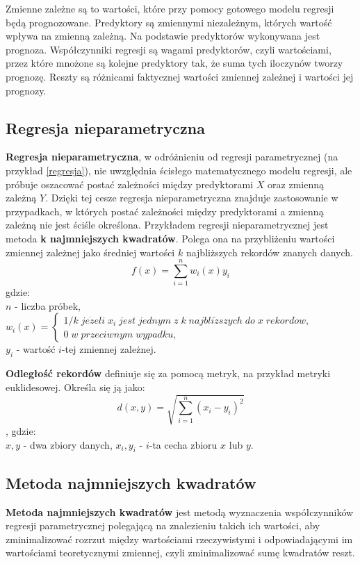 Zmienne zależne są to wartości, które przy pomocy gotowego modelu regresji będą prognozowane. Predyktory są zmiennymi niezależnym, których wartość wpływa na zmienną zależną. Na podstawie predyktorów wykonywana jest prognoza. Współczynniki regresji są wagami predyktorów, czyli wartościami, przez które mnożone są kolejne predyktory tak, że suma tych iloczynów tworzy prognozę. Reszty są różnicami faktycznej wartości zmiennej zależnej i wartości jej prognozy.
\subsection{Regresja nieparametryczna}
\textbf{Regresja nieparametryczna}, w odróżnieniu od regresji parametrycznej (na przykład \ref{regresja}), nie uwzględnia ścisłego matematycznego modelu regresji, ale próbuje oszacować postać zależności między predyktorami \(X\) oraz zmienną zależną \(Y\). Dzięki tej cesze regresja nieparametryczna znajduje zastosowanie w przypadkach, w których postać zależności między predyktorami a zmienną zależną nie jest ściśle określona.\cite{nonparametricregression}
Przykładem regresji nieparametrycznej jest metoda \textbf{k najmniejszych kwadratów}. Polega ona na przybliżeniu wartości zmiennej zależnej jako średniej wartości \(k\) najbliższych rekordów znanych danych.
\[f(x)=\sum_{i = 1}^{n}w_i(x)y_i \]
gdzie:\\
\(n\) - liczba próbek,\\[10pt]
\(w_i(x) = \left\{\begin{array}{ll}
1/k\;je\dot{z}eli\;x_i\;jest\;jednym\;z\;k\;najbli\dot{z}szych\;do\;x\;rekord\dot{o}w,\\
0\;w\;przeciwnym\;wypadku,
\end{array}
\right. \)\\[10pt]
\(y_i\) - wartość \(i\)-tej zmiennej zależnej.\cite{ryantibshirani}

\textbf{Odległość rekordów} definiuje się za pomocą metryk, na przykład metryki euklidesowej. Określa się ją jako:
\[d(x,y)=\sqrt{\sum_{i=1}^{n}(x_i-y_i)^2} \],
gdzie:\\
\(x, y\) - dwa zbiory danych,
\(x_i, y_i\) - \(i\)-ta cecha zbioru \(x\) lub \(y\).\cite{rachelski}
\subsection{Metoda najmniejszych kwadratów}\label{najmniejsze_kwadraty}
\textbf{Metoda najmniejszych kwadratów} jest metodą wyznaczenia współczynników regresji parametrycznej polegającą na znalezieniu takich ich wartości, aby zminimalizować rozrzut między wartościami rzeczywistymi i odpowiadającymi im wartościami teoretycznymi zmiennej, czyli zminimalizować sumę kwadratów reszt.\cite{bptstatystyka}

